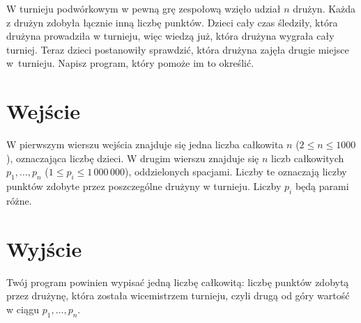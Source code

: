 \documentclass{spiral-kurs}
\begin{document}
\makeheader
%
    W turnieju podwórkowym w pewną grę zespołową wzięło udział $n$ drużyn.
    Każda z drużyn zdobyła łącznie inną liczbę punktów.
    Dzieci cały czas śledziły, która drużyna prowadziła w turnieju, więc
    wiedzą już, która drużyna wygrała cały turniej.
    Teraz dzieci postanowiły sprawdzić, która drużyna zajęła drugie miejsce
    w~turnieju.
    Napisz program, który pomoże im to określić.

    \section{Wejście}
    W pierwszym wierszu wejścia znajduje się jedna liczba całkowita $n$
    ($2 \le n \le 1000$), oznaczająca liczbę dzieci.
    W drugim wierszu znajduje się $n$ liczb całkowitych $p_1,\ldots,p_n$
    ($1 \le p_i \le 1\,000\,000$), oddzielonych spacjami.
    Liczby te oznaczają liczby punktów zdobyte przez poszczególne drużyny w turnieju.
    Liczby $p_i$ będą parami różne.
      
    \section{Wyjście}
    Twój program powinien wypisać jedną liczbę całkowitą: liczbę punktów zdobytą
    przez drużynę, która została wicemistrzem turnieju, czyli drugą od góry wartość
    w ciągu $p_1,\ldots,p_n$.



  
\end{document}
